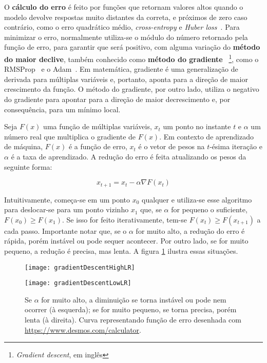 O \textbf{cálculo do erro} é feito por funções que retornam valores altos quando o modelo devolve respostas muito distantes da correta, e próximos de zero caso contrário, como o erro quadrático médio, \textit{cross-entropy} e \textit{Huber loss}~\cite{huber_loss}.
Para minimizar o erro, normalmente utiliza-se o módulo do número retornado pela função de erro, para garantir que será positivo, com alguma variação do \textbf{método do maior declive}, também conhecido como \textbf{método do gradiente}~\cite{cauchy1847} \footnote{\textit{Gradient descent}, em inglês}, como o RMSProp~\cite{rmsprop} e o Adam~\cite{DBLP:journals/corr/KingmaB14}.
Em matemática, gradiente é uma generalização de derivada para múltiplas variáveis e, portanto, aponta para a direção de maior crescimento da função.
O método do gradiente, por outro lado, utiliza o negativo do gradiente para apontar para a direção de maior decrescimento e, por consequência, para um mínimo local.

Seja $F(x)$ uma função de múltiplas variáveis, $x_{t}$ um ponto no instante $t$ e $\alpha$ um número real que multiplica o gradiente de $F(x)$.
Em contexto de aprendizado de máquina, $F(x)$ é a função de erro, $x_{t}$ é o vetor de pesos na $t$-ésima iteração e $\alpha$ é a taxa de aprendizado.
A redução do erro é feita atualizando os pesos da seguinte forma:

\begin{equation} \label{eq:error_update}
x_{t+1} = x_{t} - \alpha \nabla F(x_{t})
\end{equation}

Intuitivamente, começa-se em um ponto $x_{0}$ qualquer e utiliza-se esse algoritmo para deslocar-se para um ponto vizinho $x_{1}$ que, se $\alpha$ for pequeno o suficiente, $F(x_{0}) \geq F(x_{1})$.
Se isso for feito iterativamente, tem-se $F(x_{t}) \geq F(x_{t+1})$ a cada passo.
Importante notar que, se o $\alpha$ for muito alto, a redução do erro é rápida, porém instável ou pode sequer acontecer.
Por outro lado, se for muito pequeno, a redução é precisa, mas lenta.
A figura \ref{fig:gradientDescent} ilustra essas situações.

\begin{figure}[h!]
  \begin{minipage}[b]{.45\textwidth}
  \centering
  \texttt{[image: gradientDescentHighLR]}
  \label{fig:gdhighlr}
  \end{minipage}
  \hfill
  \begin{minipage}[b]{.45\textwidth}
  \centering
  \texttt{[image: gradientDescentLowLR]}
  \label{fig:gdlowlr}
  \end{minipage}
  \caption{Se $\alpha$ for muito alto, a diminuição se torna instável ou pode nem ocorrer (à esquerda); se for muito pequeno, se torna precisa, porém lenta (à direita). Curva representando função de erro desenhada com \url{https://www.desmos.com/calculator}.}
  \label{fig:gradientDescent}
\end{figure}

